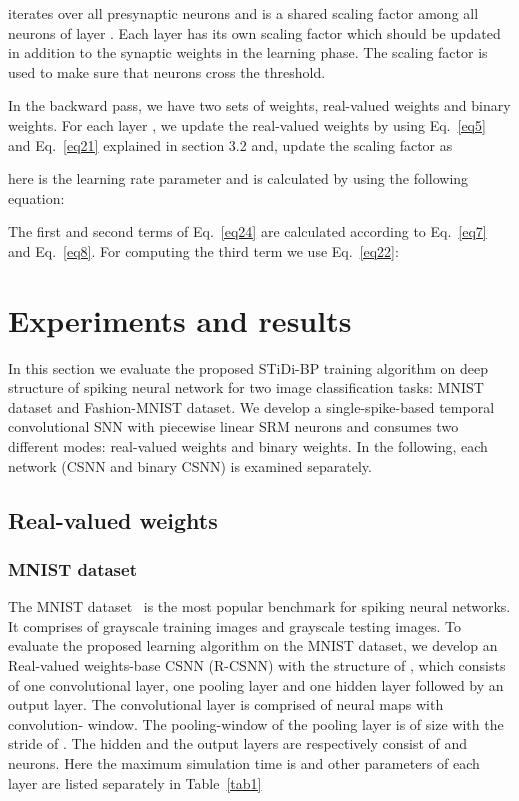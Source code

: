 \documentclass[preprint,twocolumn,5p,12pt]{article}
\begin{document}
 iterates over all presynaptic neurons and  is a shared scaling factor among all neurons of layer . Each layer has its own scaling factor which should be updated in addition to the synaptic weights in the learning phase. The scaling factor is used to make sure that neurons cross the threshold.

In the backward pass, we have two sets of weights, real-valued weights and binary weights.
For each layer , we update the real-valued weights by using Eq.~\ref{eq5} and Eq.~\ref{eq21} explained in section 3.2 and, update the scaling factor  as

here  is the learning rate parameter and  is calculated by using the following equation:


The first and second terms of Eq.~\ref{eq24} are calculated according to Eq.~\ref{eq7}  and Eq.~\ref{eq8}. For computing the third term we use Eq.~\ref{eq22}:




\section{Experiments and results}

In this section we evaluate the proposed STiDi-BP training algorithm on deep structure of spiking neural network for two image classification tasks: MNIST dataset and Fashion-MNIST dataset. We develop a single-spike-based temporal convolutional SNN with piecewise linear SRM neurons and consumes two different modes: real-valued weights and binary weights. In the following, each network (CSNN and binary CSNN) is examined separately.

\subsection{ Real-valued weights}
\subsubsection{MNIST dataset}
The MNIST dataset~\cite{mnist} is the most popular benchmark for spiking neural networks. It comprises of   grayscale training images and   grayscale testing images.
To evaluate the proposed learning algorithm on the MNIST dataset, we develop an Real-valued weights-base CSNN (R-CSNN) with the structure of , which consists of one convolutional layer, one pooling layer and one hidden layer followed by an output layer.
The convolutional layer is comprised of  neural maps with  convolution- window. The pooling-window of the pooling layer is of size  with the stride of . The hidden and the output layers are respectively consist of  and  neurons.
Here the maximum simulation time is  and other parameters of each layer are listed separately in Table~\ref{tab1}
 
\end{document}

